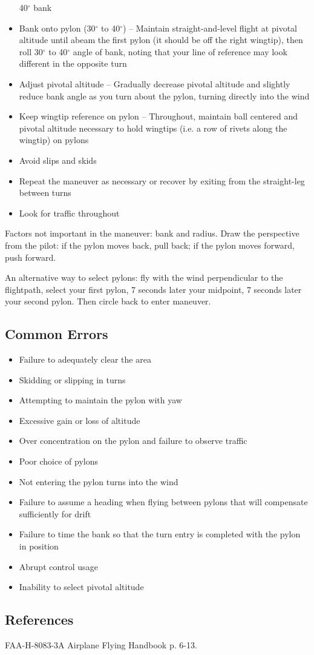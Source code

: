 \begin{itemize}
    40$^\circ$ bank
  \item Bank onto pylon (30$^\circ$ to 40$^\circ$) -- Maintain
    straight-and-level flight at pivotal altitude until abeam the first pylon
    (it should be off the right wingtip), then roll 30$^\circ$ to 40$^\circ$
    angle of bank, noting that your line of reference may look different in the
    opposite turn
  \item Adjust pivotal altitude -- Gradually decrease pivotal altitude and
    slightly reduce bank angle as you turn about the pylon, turning directly
    into the wind
  \item Keep wingtip reference on pylon -- Throughout, maintain ball centered and
    pivotal altitude necessary to hold wingtips (i.e. a row of rivets along the
    wingtip) on pylons
  \item Avoid slips and skids
  \item Repeat the maneuver as necessary or recover by exiting from the
    straight-leg between turns
  \item Look for traffic throughout
\end{itemize}

Factors not important in the maneuver: bank and radius. Draw the perspective
from the pilot: if the pylon moves back, pull back; if the pylon moves forward,
push forward.

An alternative way to select pylons: fly with the wind perpendicular to the
flightpath, select your first pylon, 7 seconds later your midpoint, 7 seconds
later your second pylon. Then circle back to enter maneuver.

\subsection{Common Errors}

\begin{itemize}
  \item Failure to adequately clear the area
  \item Skidding or slipping in turns
  \item Attempting to maintain the pylon with yaw
  \item Excessive gain or loss of altitude
  \item Over concentration on the pylon and failure to observe traffic
  \item Poor choice of pylons
  \item Not entering the pylon turns into the wind
  \item Failure to assume a heading when flying between pylons that will
    compensate sufficiently for drift
  \item Failure to time the bank so that the turn entry is completed with the
    pylon in position
  \item Abrupt control usage
  \item Inability to select pivotal altitude
\end{itemize}

\subsection{References}

FAA-H-8083-3A Airplane Flying Handbook p. 6-13.
